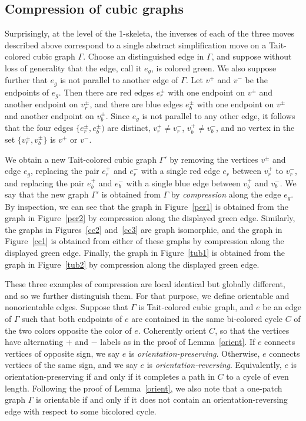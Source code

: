 \documentclass[11pt, oneside]{amsart}
\theoremstyle{theorem}
\theoremstyle{definition}
\theoremstyle{theorem}
\begin{document}
\subsection{Compression of cubic graphs}

Surprisingly, at the level of the 1-skeleta, the inverses of each of the three moves described above correspond to a single abstract simplification move on a Tait-colored cubic graph $\Gamma$.  Choose an distinguished edge in $\Gamma$, and suppose without loss of generality that the edge, call it $e_g$, is colored green.  We also suppose further that $e_g$ is not parallel to another edge of $\Gamma$.  Let $v^+$ and $v^-$ be the endpoints of $e_g$.  Then there are red edges $e_r^{\pm}$ with one endpoint on $v^{\pm}$ and another endpoint on $v_r^{\pm}$, and there are blue edges $e_b^{\pm}$ with one endpoint on $v^{\pm}$ and another endpoint on $v_b^{\pm}$.  Since $e_g$ is not parallel to any other edge, it follows that the four edges $\{e_r^{\pm},e_b^{\pm})$ are distinct, $v_r^+ \neq v_r^-$, $v_b^+ \neq v_b^-$, and no vertex in the set $\{v_r^{\pm},v_b^{\pm}\}$ is $v^+$ or $v^-$.

We obtain a new Tait-colored cubic graph $\Gamma'$ by removing the vertices $v^{\pm}$ and edge $e_g$, replacing the pair $e_r^+$ and $e_r^-$ with a single red edge $e_r$ between $v_r^+$ to $v_r^-$, and replacing the pair $e_b^+$ and $e_b^-$ with a single blue edge between $v_b^+$ and $v_b^-$.  We say that the new graph $\Gamma'$ is obtained from $\Gamma$ by \emph{compression} along the edge $e_g$.  By inspection, we can see that the graph in Figure~\ref{per1} is obtained from the graph in Figure~\ref{per2} by compression along the displayed green edge.  Similarly, the graphs in Figures~\ref{cc2} and~\ref{cc3} are graph isomorphic, and the graph in Figure~\ref{cc1} is obtained from either of these graphs by compression along the displayed green edge.  Finally, the graph in Figure~\ref{tub1} is obtained from the graph in Figure~\ref{tub2} by compression along the displayed green edge.

These three examples of compression are local identical but globally different, and so we further distinguish them.  For that purpose, we define orientable and nonorientable edges.  Suppose that $\Gamma$ is Tait-colored cubic graph, and $e$ be an edge of $\Gamma$ such that both endpoints of $e$ are contained in the same bi-colored cycle $C$ of the two colors opposite the color of $e$.  Coherently orient $C$, so that the vertices have alternating $+$ and $-$ labels as in the proof of Lemma~\ref{orient}.  If $e$ connects vertices of opposite sign, we say $e$ is \emph{orientation-preserving}.  Otherwise, $e$ connects vertices of the same sign, and we say $e$ is \emph{orientation-reversing}.  Equivalently, $e$ is orientation-preserving if and only if it completes a path in $C$ to a cycle of even length. Following the proof of Lemma~\ref{orient}, we also note that a one-patch graph $\Gamma$ is orientable if and only if it does not contain an orientation-reversing edge with respect to some  bicolored cycle.
\end{document}
